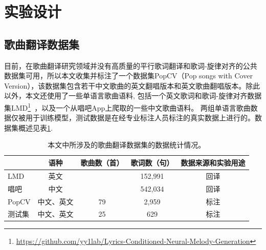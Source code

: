 \section{实验设计}
\subsection{歌曲翻译数据集}
目前，在歌曲翻译研究领域并没有高质量的平行歌词翻译和歌词-旋律对齐的公共数据集可用，所以本文收集并标注了一个数据集PopCV（Pop songs with Cover Version），该数据集包含若干中文歌曲的英文翻唱版本和英文歌曲翻唱版本。除此以外，本文还使用了一些单语言歌曲语料, 包括一个英文歌词和歌词-旋律对齐数据集LMD\footnote{\url{https://github.com/yy1lab/Lyrics-Conditioned-Neural-Melody-Generation}}~\citep{LMD}，以及一个从唱吧App上爬取的一些中文歌曲语料。
两组单语言歌曲数据仅被用于训练模型，测试数据是在经专业标注人员标注的真实数据上进行的。数据集概述见表\ref{tab:dataset_stat}.
\begin{table}[htbp]
    \centering
    \begin{tabular}{|l|c|c|c|c|}
    \hline
         & 语种 & 歌曲数（首） & 歌词数（句） & 数据来源和实验用途\\
    \hline
     LMD & 英文 & \diagbox[]{}{} & 152,991 & 回译\\
    \hline
     唱吧 & 中文 & \diagbox[]{}{} & 542,034 & 回译\\
    \hline
     PopCV & 中文、英文 & 79 & 2,959 & 标注\\
    \hline
     测试集 & 中文、英文 & 25 & 629 & 标注\\
    \hline
    \end{tabular}
    \caption{本文中所涉及的歌曲翻译数据集的数据统计情况。}
    \label{tab:dataset_stat}
\end{table}
